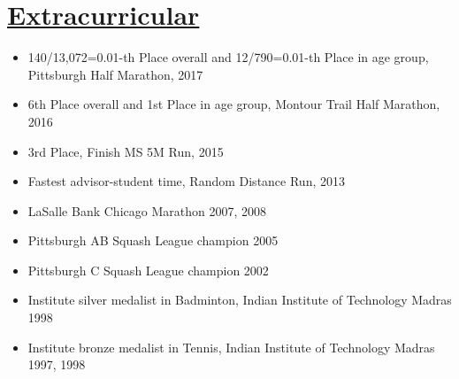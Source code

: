
\section{\href{https://www.athlinks.com/athletes/130400313}{Extracurricular}}
\begin{itemize}
\addtolength{\itemsep}{-0.5\baselineskip}
\item 140/13,072=0.01-th Place overall and 12/790=0.01-th Place in age group, Pittsburgh Half Marathon, 2017
\item 6th Place overall and 1st Place in age group, Montour Trail Half Marathon, 2016
\item 3rd Place, Finish MS 5M Run, 2015 
\item Fastest advisor-student time, Random Distance Run, 2013
\item LaSalle Bank Chicago Marathon 2007, 2008
\item Pittsburgh AB Squash League champion 2005
\item Pittsburgh C Squash League champion 2002
\item Institute silver medalist in Badminton, Indian Institute of Technology Madras 1998
\item Institute bronze medalist in Tennis, Indian Institute of Technology Madras 1997, 1998
\end{itemize}
